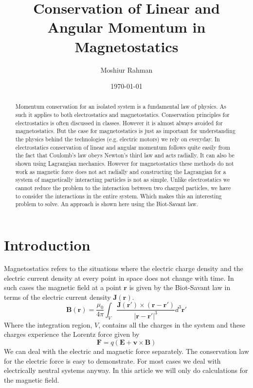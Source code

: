 \documentclass[titlepage, a4paper, 11pt]{article}
\begin{document}
\title{Conservation of Linear and Angular Momentum in Magnetostatics}
\author{Moshiur Rahman}
\date{\today}

\begin{abstract}
	Momentum conservation for an isolated system is a fundamental law of physics. As such it applies
	to both electrostatics and magnetostatics. Conservation principles for electrostatics is
	often discussed in classes. However it is almost always avoided for magnetostatics. But the case
	for magnetostatics is just as important for understanding the physics behind the technologies
	(e.g. electric motors) we rely on everyday. In electrostatics conservation of linear and angular
	momentum follows quite easily from the fact that Coulomb's law obeys Newton's third law and acts
	radially. It can also be shown using Lagrangian mechanics. However for magnetostatics these
	methods do not work as magnetic force does not act radially and constructing the Lagrangian for
	a system of magnetically interacting particles is not as simple. Unlike electrostatics we cannot
	reduce the problem to the interaction between two charged particles, we have to consider the
	interactions in the entire system. Which makes this an interesting problem to solve. An approach
	is shown here using the Biot-Savant law.
\end{abstract}

\maketitle

\section{Introduction}
Magnetostatics refers to the situations where the electric charge density and the electric current
density at every point in space does not change with time. In such cases the magnetic field at a
point $\mathbf{r}$ is given by the Biot-Savant law \cite{Griffiths} in terms of the electric current
density $\mathbf{J}(\mathbf{r})$.
\begin{equation}
	\mathbf{B}(\mathbf{r}) = \frac{\mu_0}{4\pi} \int_V \frac{\mathbf{J}(\mathbf{r}') \times
	(\mathbf{r} - \mathbf{r}')}{|\mathbf{r} - \mathbf{r}'|^3} d^3\mathbf{\mathbf{r}}'
	\label{Biot-Savant law}
\end{equation}
Where the integration region, $V$, contains all the charges in the system and these charges
experience the Lorentz force given by
\begin{equation}
	\mathbf{F} = q (\mathbf{E} + \mathbf{v} \times \mathbf{B})
\end{equation}
We can deal with the electric and magnetic force separately. The conservation law for the electric
force is easy to demonstrate. For most cases we deal with electrically neutral systems anyway. In
this article we will only do calculations for the magnetic field.
\end{document}
